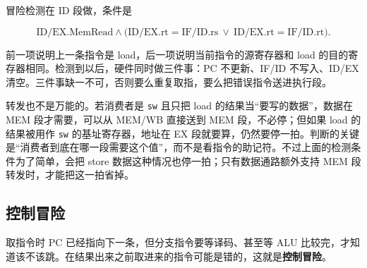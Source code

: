 冒险检测在 ID 段做，条件是

\[
\text{ID/EX.MemRead}\land
\bigl(\text{ID/EX.rt}=\text{IF/ID.rs}\ \lor\ \text{ID/EX.rt}=\text{IF/ID.rt}\bigr).
\]

前一项说明上一条指令是 load，后一项说明当前指令的源寄存器和 load 的目的寄存器相同。检测到以后，硬件同时做三件事：PC 不更新、IF/ID 不写入、ID/EX 清空。三件事缺一不可，否则要么重复取指，要么把错误指令送进执行段。

转发也不是万能的。若消费者是 \texttt{sw} 且只把 load 的结果当“要写的数据”，数据在 MEM 段才需要，可以从 MEM/WB 直接送到 MEM 段，不必停；但如果 load 的结果被用作 \texttt{sw} 的基址寄存器，地址在 EX 段就要算，仍然要停一拍。判断的关键是“消费者到底在哪一段需要这个值”，而不是看指令的助记符。不过上面的检测条件为了简单，会把 store 数据这种情况也停一拍；只有数据通路额外支持 MEM 段转发时，才能把这一拍省掉。

\subsection{控制冒险}

取指令时 PC 已经指向下一条，但分支指令要等译码、甚至等 ALU 比较完，才知道该不该跳。在结果出来之前取进来的指令可能是错的，这就是\textbf{控制冒险}。


